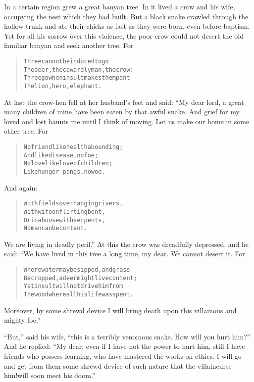 \documentclass[article, twoside, 14pt]{memoir}
\renewenvironment{verbatim}{%
\begin{quote}%
\vskip -10pt%
\begin{alltt}\normalfont\large}{\end{alltt}%
\end{quote}%
\vskip -10pt
} %
\begin{document}
\label{s8}

In a certain region grew a great banyan tree. In it lived a
crow and his wife, occupying the nest which they had built. But a
black snake crawled through the hollow trunk and ate their chicks
as fast as they were born, even before baptism. Yet for all his
sorrow over this violence, the poor crow could not desert the old
familiar banyan and seek another tree. For

\begin{verbatim}
Three cannot be induced to go{\textemdash}
The deer, the cowardly man, the crow:
Three go when insult makes them pant{\textemdash}
The lion, hero, elephant.
\end{verbatim}
At last the crow-hen fell at her husband's feet and said: “My dear
lord, a great many children of mine have been eaten by that awful
snake. And grief for my loved and lost haunts me until I think of
moving. Let us make our home in some other tree. For

\begin{verbatim}
No friend like health abounding;
    And like disease, no foe;
No love like love of children;
    Like hunger-pangs, no woe.
\end{verbatim}
And again:

\begin{verbatim}
With fields overhanging rivers,
    With wife on flirting bent,
Or in a house with serpents,
    No man can be content.
\end{verbatim}
We are living in deadly peril.” At this the crow was dreadfully
depressed, and he said: “We have lived in this tree a long time, my
dear. We cannot desert it. For

\begin{verbatim}
Where water may be sipped, and grass
    Be cropped, a deer might live content;
Yet insult will not drive him from
    The wood where all his life was spent.
\end{verbatim}
Moreover, by some shrewd device I will bring death upon this
villainous and mighty foe.”

``But,'' said his wife,
``this is a terribly venomous snake. How will you hurt him?''
And he replied:
``My dear, even if I have not the power to hurt him, still I have friends who possess learning, who have mastered the works on ethics. I will go and get from them some shrewd device of such nature that the villain{\textemdash}curse him!{\textemdash}will soon meet his doom.''
\end{document}
